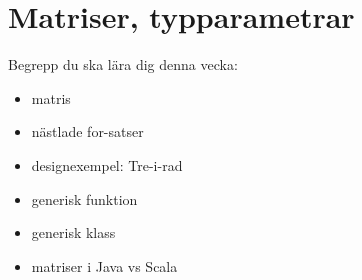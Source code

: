 \chapter{Matriser, typparametrar}\label{chapter:W09}
Begrepp du ska lära dig denna vecka:
\begin{itemize}[noitemsep,label={$\square$},leftmargin=*]
\item matris
\item nästlade for-satser
\item designexempel: Tre-i-rad
\item generisk funktion
\item generisk klass
\item matriser i Java vs Scala\end{itemize}
